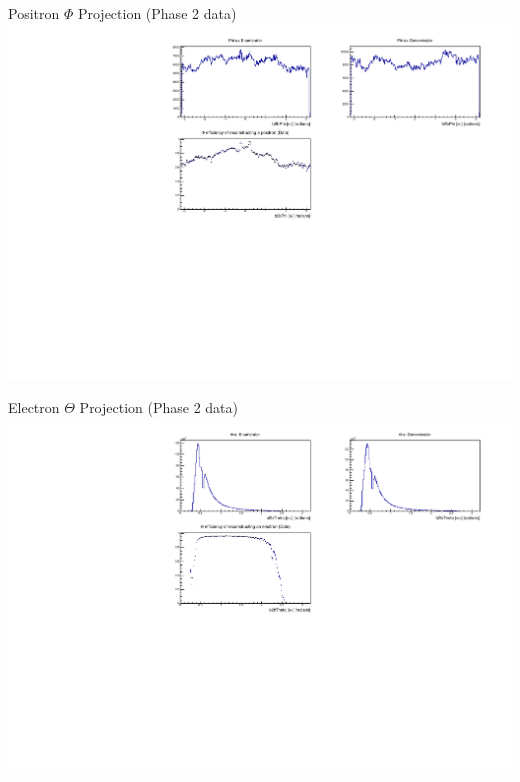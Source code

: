 \documentclass[10pt]{beamer}
\begin{document}
\begin{frame}{Positron $\Phi$ Projection (Phase 2 data)}
	\centering
	\includegraphics[width=\textwidth]{Plots/Eff/epPhiPro_Data}
\end{frame}


\begin{frame}{Electron $\Theta$ Projection (Phase 2 data)}
	\centering
	\includegraphics[width=\textwidth]{Plots/Eff/emThetaPro_Data}
\end{frame}
\end{document}
